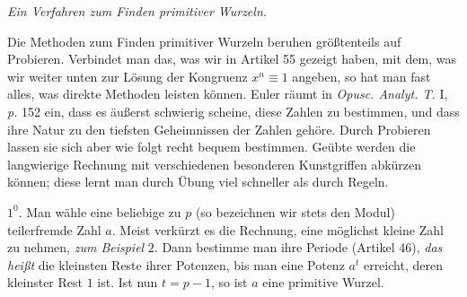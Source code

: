 \begin{center}\emph{Ein Verfahren zum Finden primitiver Wurzeln.}\end{center}

Die Methoden zum Finden primitiver Wurzeln beruhen größtenteils auf Probieren. Verbindet man das, was wir in Artikel 55 gezeigt haben, mit dem, was wir weiter unten zur Lösung der Kongruenz $x^n\equiv1$ angeben, so hat man fast alles, was direkte Methoden leisten können. Euler räumt in \emph{Opusc. Analyt. T.} I, \emph{p.} 152 ein, dass es äußerst schwierig scheine, diese Zahlen zu bestimmen, und dass ihre Natur zu den tiefsten Geheimnissen der Zahlen gehöre. Durch Probieren lassen sie sich aber wie folgt recht bequem bestimmen. Geübte werden die langwierige Rechnung mit verschiedenen besonderen Kunstgriffen abkürzen können; diese lernt man durch Übung viel schneller als durch Regeln.

$1^0$. Man wähle eine beliebige zu $p$ (so bezeichnen wir stets den Modul) teilerfremde Zahl $a$. Meist verkürzt es die Rechnung, eine möglichst kleine Zahl zu nehmen, \emph{zum Beispiel} $2$. Dann bestimme man ihre Periode (Artikel 46), \emph{das heißt} die kleinsten Reste ihrer Potenzen, bis man eine Potenz $a^t$ erreicht, deren kleinster Rest $1$ ist. Ist nun $t=p-1$, so ist $a$ eine primitive Wurzel.

